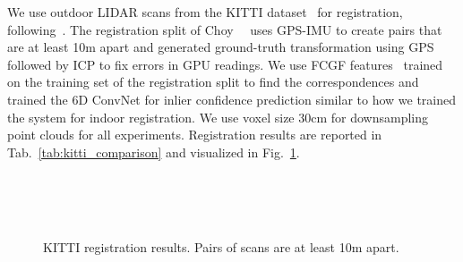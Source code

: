 \documentclass[10pt,twocolumn,letterpaper]{article}
\begin{document}
We use outdoor LIDAR scans from the KITTI dataset~\cite{kitti} for registration, following~\cite{FCGF2019}. The registration split of Choy~\etal~\cite{FCGF2019} uses GPS-IMU to create pairs that are at least 10m apart and generated ground-truth transformation using GPS followed by ICP to fix errors in GPU readings.
We use FCGF features~\cite{FCGF2019} trained on the training set of the registration split to find the correspondences and trained the 6D ConvNet for inlier confidence prediction similar to how we trained the system for indoor registration.
We use voxel size 30cm for downsampling point clouds for all experiments. Registration results are reported in Tab.~\ref{tab:kitti_comparison} and visualized in Fig.~\ref{fig:kitti-registration}. 
\begin{figure}[ht!]
    \centering
    \\
    \\
    \\
    \caption{KITTI registration results. Pairs of scans are at least 10m apart.}
    \label{fig:kitti-registration}
\end{figure} \begin{table}
\centering
\small
\caption{Registration on the KITTI test split~\cite{kitti,FCGF2019}. We use thresholds of 0.6m and 5 degrees. `Ours + ICP' refers to our method followed by ICP for fine-grained pose adjustment. The runtime includes feature extraction.}
\label{tab:kitti_comparison}
\end{table}
  
\end{document}
